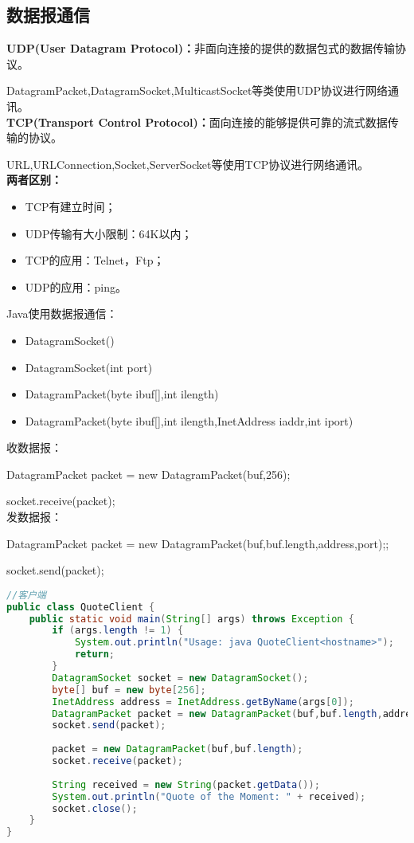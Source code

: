 \subsection{数据报通信}
\noindent \textbf{UDP(User Datagram Protocol)：}非面向连接的提供的数据包式的数据传输协议。
\par DatagramPacket,DatagramSocket,MulticastSocket等类使用UDP协议进行网络通讯。
\\ \textbf{TCP(Transport Control Protocol)：}面向连接的能够提供可靠的流式数据传输的协议。
\par URL,URLConnection,Socket,ServerSocket等使用TCP协议进行网络通讯。
\\ \textbf{两者区别：}
\begin{itemize}
	\item TCP有建立时间；
	\item UDP传输有大小限制：64K以内；
	\item TCP的应用：Telnet，Ftp；
	\item UDP的应用：ping。
\end{itemize}
Java使用数据报通信：
\begin{itemize}
	\item DatagramSocket()
	\item DatagramSocket(int port)
	\item DatagramPacket(byte ibuf[],int ilength)
	\item DatagramPacket(byte ibuf[],int ilength,InetAddress iaddr,int iport)
\end{itemize}
收数据报：
\par DatagramPacket packet = new DatagramPacket(buf,256);
\par socket.receive(packet);
\\发数据报：
\par DatagramPacket packet = new DatagramPacket(buf,buf.length,address,port);;
\par socket.send(packet);
\begin{lstlisting}[language=java]
//客户端
public class QuoteClient {
	public static void main(String[] args) throws Exception {
		if (args.length != 1) {
			System.out.println("Usage: java QuoteClient<hostname>");
			return;
		}
		DatagramSocket socket = new DatagramSocket();
		byte[] buf = new byte[256];
		InetAddress address = InetAddress.getByName(args[0]);
		DatagramPacket packet = new DatagramPacket(buf,buf.length,address,4445);
		socket.send(packet);
		
		packet = new DatagramPacket(buf,buf.length);
		socket.receive(packet);
		
		String received = new String(packet.getData());
		System.out.println("Quote of the Moment: " + received);
		socket.close();
	}
}
\end{lstlisting}
